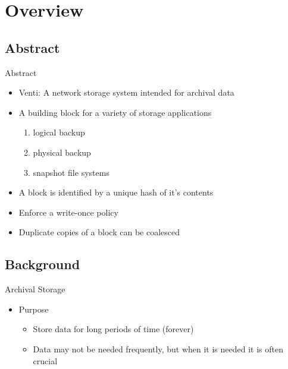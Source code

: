 \section{Overview}\label{overview}

\subsection{Abstract}\label{abstract}

\begin{frame}{Abstract}

\begin{itemize}
\itemsep1pt\parskip0pt
\item
  Venti: A network storage system intended for archival data
\item
  A building block for a variety of storage applications

  \begin{enumerate}
  \def\labelenumi{\arabic{enumi})}
  \itemsep1pt\parskip0pt
  \item
    logical backup
  \item
    physical backup
  \item
    snapshot file systems
  \end{enumerate}
\item
  A block is identified by a unique hash of it's contents
\item
  Enforce a write-once policy
\item
  Duplicate copies of a block can be coalesced
\end{itemize}

\end{frame}

\subsection{Background}\label{background}

\begin{frame}{Archival Storage}

\begin{itemize}
\itemsep1pt\parskip0pt
\item
  Purpose

  \begin{itemize}
  \itemsep1pt\parskip0pt
  \item
    Store data for long periods of time (forever)
  \item
    Data may not be needed frequently, but when it is needed it is often
    crucial
  \end{itemize}
\end{itemize}

\end{frame}

